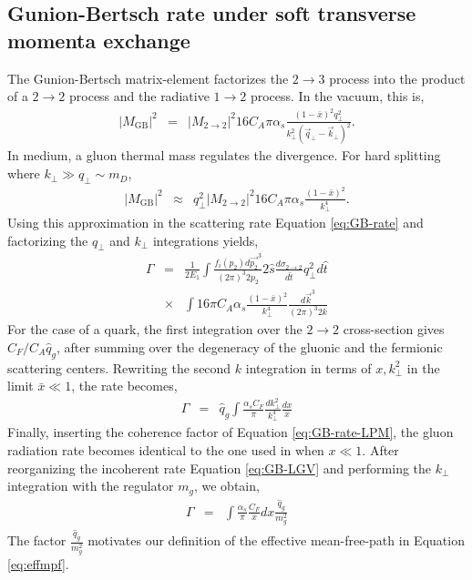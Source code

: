 \documentclass[aps, prc, reprint, amsmath, groupedaddress, nofootinbib]{revtex4-1}
\begin{document}
\begin{appendices}
\section{Gunion-Bertsch rate under soft transverse momenta exchange}
\label{app:consistency}
The Gunion-Bertsch matrix-element factorizes the $2\rightarrow3$ process into the product of a $2\rightarrow2$ process and the radiative $1\rightarrow 2$ process. 
In the vacuum, this is,
\begin{eqnarray}
|M_{\textrm{GB}}|^2 &=& |M_{2\rightarrow 2}|^2 16 C_A \pi \alpha_s \frac{(1-\bar{x})^2q_\perp^2}{k_\perp^2\left(\vec{q}_\perp-\vec{k}_\perp\right)^2}.
\end{eqnarray}
In medium, a gluon thermal mass regulates the divergence. 
For hard splitting where $k_\perp \gg q_\perp \sim m_D$, 
\begin{eqnarray}
|M_{\textrm{GB}}|^2 &\approx & q_\perp^2 |M_{2\rightarrow 2}|^2 16 C_A \pi \alpha_s \frac{(1-\bar{x})^2}{k_\perp^4}.
\end{eqnarray}
Using this approximation in the scattering rate Equation \ref{eq:GB-rate} and factorizing the $q_\perp$ and $k_\perp$ integrations yields,
\begin{eqnarray}
\Gamma &=& \frac{1}{2E_1}\int\frac{f_i(p_2)d\vec{p_2}^3}{(2\pi)^3 2p_2}2\hat{s} \frac{d\sigma_{2\rightarrow 2}}{d\hat{t}}q_\perp^2 d\hat{t} \nonumber \\
&\times& \int 16\pi C_A \alpha_s \frac{(1-\bar{x})^2}{k_\perp^4} \frac{d\vec{k}^3}{(2\pi)^3 2k}
\end{eqnarray}
For the case of a quark, the first integration over the $2\rightarrow 2$ cross-section gives $C_F/C_A\hat{q}_g$, after summing over the degeneracy of the gluonic and the fermionic scattering centers.
Rewriting the second $k$ integration in terms of $x, k_\perp^2$ in the limit $\bar{x}\ll 1$, the rate becomes,
\begin{eqnarray}\label{eq:GB-LGV}
\Gamma &=& \hat{q}_g \int \frac{\alpha_s C_F}{\pi} \frac{dk_\perp^2}{k_\perp^4} \frac{dx}{x}
\end{eqnarray}
Finally, inserting the coherence factor of Equation \ref{eq:GB-rate-LPM}, the gluon radiation rate becomes identical to the one used in \cite{Cao:2013ita} when $x\ll 1$.
After reorganizing the incoherent rate Equation \ref{eq:GB-LGV} and performing the $k_\perp$ integration with the regulator $m_g$, we obtain,
\begin{eqnarray}
\Gamma &=& \int \frac{\alpha_s}{\pi} \frac{C_F}{x}dx \frac{\hat{q}_g}{m_g^2} 
\end{eqnarray}
The factor $\frac{\hat{q}_g}{m_g^2}$ motivates our definition of the effective mean-free-path in Equation \ref{eq:effmpf}.


\end{appendices}
\end{document}
